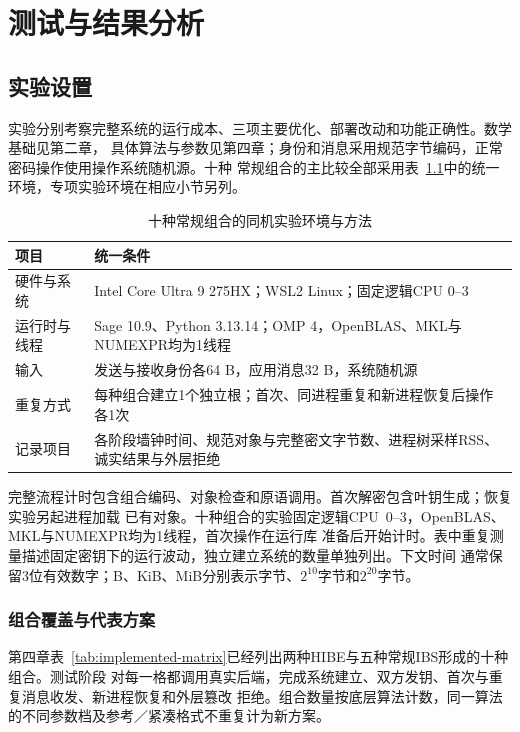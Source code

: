 \chapter{测试与结果分析}

\section{实验设置}
实验分别考察完整系统的运行成本、三项主要优化、部署改动和功能正确性。数学基础见第二章，
具体算法与参数见第四章；身份和消息采用规范字节编码，正常密码操作使用操作系统随机源。十种
常规组合的主比较全部采用表~\ref{tab:environments}中的统一环境，专项实验环境在相应小节另列。

\begin{table}[H]
\centering\small
\caption{十种常规组合的同机实验环境与方法}
\label{tab:environments}
\begin{tabularx}{\textwidth}{@{}p{}X@{}}
\toprule
\rowcolor{black!8} 项目 & 统一条件 \\
\midrule
硬件与系统 & Intel Core Ultra 9 275HX；WSL2 Linux；固定逻辑CPU 0--3 \\
运行时与线程 & Sage 10.9、Python 3.13.14；OMP 4，OpenBLAS、MKL与NUMEXPR均为1线程 \\
输入 & 发送与接收身份各64 B，应用消息32 B，系统随机源 \\
重复方式 & 每种组合建立1个独立根；首次、同进程重复和新进程恢复后操作各1次 \\
记录项目 & 各阶段墙钟时间、规范对象与完整密文字节数、进程树采样RSS、诚实结果与外层拒绝 \\
\bottomrule
\end{tabularx}
\end{table}

完整流程计时包含组合编码、对象检查和原语调用。首次解密包含叶钥生成；恢复实验另起进程加载
已有对象。十种组合的实验固定逻辑CPU~0--3，OpenBLAS、MKL与NUMEXPR均为1线程，首次操作在运行库
准备后开始计时。表中重复测量描述固定密钥下的运行波动，独立建立系统的数量单独列出。下文时间
通常保留3位有效数字；B、KiB、MiB分别表示字节、$2^{10}$字节和$2^{20}$字节。

\subsection{组合覆盖与代表方案}

第四章表~\ref{tab:implemented-matrix}已经列出两种HIBE与五种常规IBS形成的十种组合。测试阶段
对每一格都调用真实后端，完成系统建立、双方发钥、首次与重复消息收发、新进程恢复和外层篡改
拒绝。组合数量按底层算法计数，同一算法的不同参数档及参考／紧凑格式不重复计为新方案。


